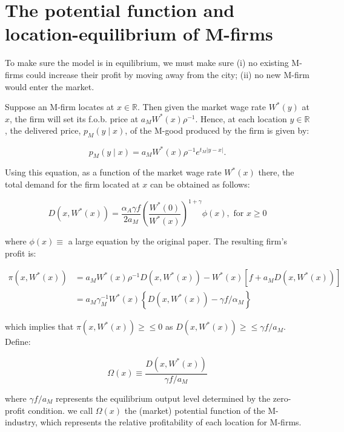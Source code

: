 \section{The potential function and location-equilibrium of M-firms}

To make sure the model is in equilibrium, we must make sure (i) no existing M-firms could increase their profit by moving away from the city; (ii) no new M-firm would enter the market.

Suppose an M-firm locates at $x \in \mathbb{R}$. Then given the market wage rate $W^*(y)$ at $x$, the firm will set its f.o.b. price at $a_M W^*(x) \rho^{-1}$. Hence, at each location $y \in \mathbb{R}$, the delivered price, $p_M(y \mid x)$, of the M-good produced by the firm is given by:

\begin{equation}
  p_M(y \mid x) = a_M W^*(x) \rho^{-1} e^{t_M|y - x|}.
\end{equation}

Using this equation, as a function of the market wage rate $W^*(x)$ there, the total demand for the firm located at $x$ can be obtained as follows:

\begin{equation}
  D(x, W^*(x)) = \frac{\alpha_A \gamma f}{2a_M} (\frac{W^*(0)}{W^*(x)})^{1 + \gamma} \phi(x), \text{ for } x \geq 0
\end{equation}

where $\phi(x) \equiv$ a large equation by the original paper. The resulting firm's profit is:

\begin{equation}
  \begin{aligned}
    \pi(x, W^*(x)) & = a_M W^*(x) \rho^{-1} D(x, W^*(x)) - W^*(x)[f + a_M D(x, W^*(x))] \\
                   & = a_M \gamma_M^{-1} W^*(x) \left\{ D(x, W^*(x)) - \gamma f / \alpha_M \right\}
  \end{aligned}
\end{equation}

which implies that $\pi(x, W^*(x)) \geq \leq 0$ as $D(x, W^*(x)) \geq \leq \gamma f / a_M$. Define:

\begin{equation}
  \Omega(x) \equiv \frac{D(x, W^*(x))}{\gamma f / a_M} 
\end{equation}

where $\gamma f/a_M$ represents the equilibrium output level determined by the zero-profit condition. we call $\Omega(x)$ the (market) potential function of the M-industry, which represents the relative profitability of each location for M-firms.
